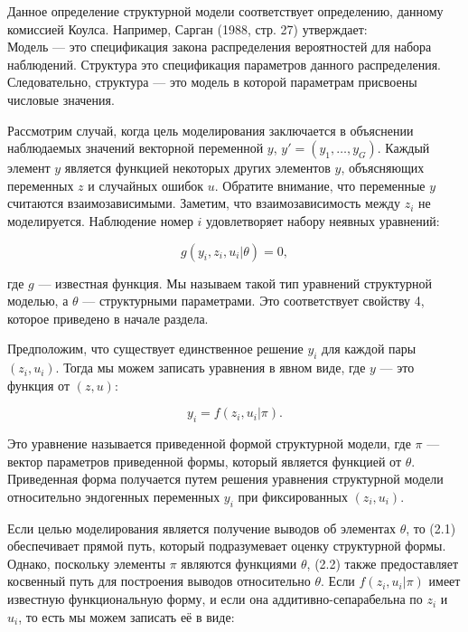 Данное определение структурной модели соответствует определению, данному комиссией Коулса. Например, Сарган (1988, стр. 27) утверждает: \\


Модель --- это спецификация закона распределения  вероятностей для набора наблюдений. Структура это спецификация параметров данного распределения. Следовательно, структура --- это модель в которой параметрам присвоены  числовые значения. 


Рассмотрим случай, когда цель моделирования заключается в объяснении наблюдаемых значений векторной переменной $y$, $y'= (y_{1}, \ldots , y_{G})$. Каждый элемент $y$ является функцией некоторых других элементов $y$, объясняющих переменных $z$ и случайных ошибок $u$. Обратите внимание, что переменные $y$ считаются взаимозависимыми. Заметим, что  взаимозависимость между $z_{i}$ не моделируется. Наблюдение номер  $i$ удовлетворяет набору неявных уравнений:
	
\begin{equation}
g(y_{i},z_{i},u_{i}|\theta)=0,
\end{equation}

где $g$ --- известная функция. Мы называем такой тип уравнений структурной моделью, а $\theta$  --- структурными параметрами. Это соответствует свойству 4, которое приведено в начале раздела. 


Предположим, что существует единственное решение $y_{i}$ для каждой пары $(z_{i},u_{i})$. Тогда мы можем записать уравнения в явном виде, где  $y$ --- это функция от $(z, u)$:

\begin{equation}
y_{i}=f(z_{i},u_{i}|\pi).
\end{equation}


Это уравнение называется приведенной формой структурной модели, где $\pi$ --- вектор параметров приведенной формы, который является функцией от $\theta$. Приведенная форма получается путем решения уравнения структурной модели относительно эндогенных переменных $y_{i}$ при фиксированных $(z_{i},u_{i})$. 


Если целью моделирования является получение выводов об элементах $\theta$, то (2.1) обеспечивает прямой путь, который подразумевает оценку структурной формы. Однако, поскольку элементы $\pi$ являются функциями $\theta$, (2.2) также предоставляет косвенный путь для построения выводов относительно $\theta$. Если $f(z_{i},u_{i}|\pi)$ имеет известную функциональную форму, и если она аддитивно-сепарабельна по $z_{i}$ и $u_{i}$, то есть мы можем записать её в виде:
	
